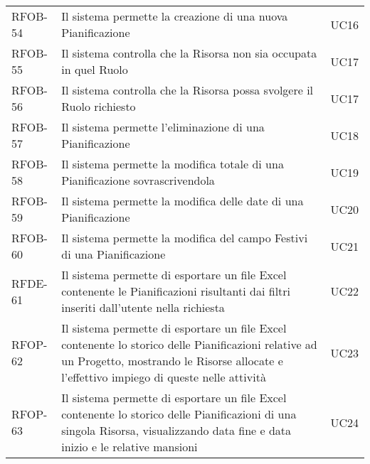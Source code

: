 \begin{center}
\begin{longtable}{p{2.0cm}|p{8cm}|p{2.7cm}}
RFOB-54  & Il sistema permette la creazione di una nuova Pianificazione & UC16 \\  
RFOB-55  & Il sistema controlla che la Risorsa non sia occupata in quel Ruolo & UC17 \\ 
RFOB-56  & Il sistema controlla che la Risorsa possa svolgere il Ruolo richiesto & UC17 \\ 
RFOB-57  & Il sistema permette l'eliminazione di una Pianificazione  & UC18 \\ 
RFOB-58 & Il sistema permette la modifica totale di una Pianificazione sovrascrivendola & UC19\\
RFOB-59 & Il sistema permette la modifica delle date di una Pianificazione & UC20\\
RFOB-60 & Il sistema permette la modifica del campo Festivi di una Pianificazione & UC21\\
RFDE-61 & Il sistema permette di esportare un file Excel contenente le Pianificazioni risultanti dai filtri inseriti dall'utente nella richiesta & UC22\\
\hypertarget{rf62}{RFOP-62} & Il sistema permette di esportare un file Excel contenente lo storico delle Pianificazioni relative ad un Progetto, mostrando le Risorse allocate e l'effettivo impiego di queste nelle attività & UC23\\
\hypertarget{rf63}{RFOP-63} &  Il sistema permette di esportare un file Excel contenente lo storico delle Pianificazioni di una singola Risorsa, visualizzando data fine e data inizio e le relative mansioni & UC24\\


\end{longtable}
\end{center}
